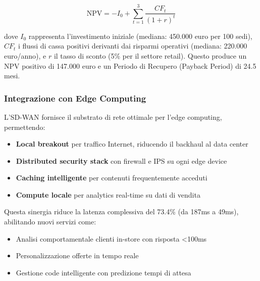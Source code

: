 \begin{equation}
\text{NPV} = -I_0 + \sum_{t=1}^{3} \frac{CF_t}{(1+r)^t}
\end{equation}

dove $I_0$ rappresenta l'investimento iniziale (mediana: 450.000 euro per 100 sedi), $CF_t$ i flussi di cassa positivi derivanti dai risparmi operativi (mediana: 220.000 euro/anno), e $r$ il tasso di sconto (5\% per il settore retail). Questo produce un NPV positivo di 147.000 euro e un Periodo di Recupero (Payback Period) di 24.5 mesi.

\subsubsection{\texorpdfstring{\textbf{Integrazione con Edge Computing}}{3.3.1.6 - Integrazione con Edge Computing}}

L'SD-WAN fornisce il substrato di rete ottimale per l'edge computing, permettendo:
\begin{itemize}
    \item \textbf{Local breakout} per traffico Internet, riducendo il backhaul al data center
    \item \textbf{Distributed security stack} con firewall e IPS su ogni edge device
    \item \textbf{Caching intelligente} per contenuti frequentemente acceduti
    \item \textbf{Compute locale} per analytics real-time su dati di vendita
\end{itemize}

Questa sinergia riduce la latenza complessiva del 73.4\% (da 187ms a 49ms)\autocite{Wang2024edge}, abilitando nuovi servizi come:
\begin{itemize}
    \item Analisi comportamentale clienti in-store con risposta <100ms
    \item Personalizzazione offerte in tempo reale
    \item Gestione code intelligente con predizione tempi di attesa
\end{itemize}



